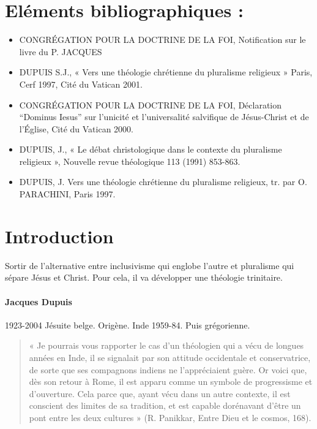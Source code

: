 

\section{Eléments bibliographiques :}
\begin{itemize}
    \item CONGRÉGATION POUR LA DOCTRINE DE LA FOI, Notification sur le livre du P. JACQUES
   \item DUPUIS S.J., « Vers une théologie chrétienne du pluralisme religieux » Paris, Cerf 1997,
Cité du Vatican 2001.
   \item CONGRÉGATION POUR LA DOCTRINE DE LA FOI, Déclaration “Dominus Iesus” sur l’unicité
et l’universalité salvifique de Jésus-Christ et de l’Église, Cité du Vatican 2000.
   \item DUPUIS, J., « Le débat christologique dans le contexte du pluralisme religieux », Nouvelle
revue théologique 113 (1991) 853-863.
   \item DUPUIS, J. Vers une théologie chrétienne du pluralisme religieux, tr. par O. PARACHINI, Paris
1997.
\end{itemize}


\section{Introduction}

\begin{Prop}
Sortir de l'alternative entre inclusivisme qui englobe l'autre et pluralisme qui sépare Jésus et Christ.
Pour cela, il va développer une théologie trinitaire. 
\end{Prop}



\paragraph{Jacques Dupuis} 1923-2004 Jésuite belge. Origène. Inde 1959-84. Puis grégorienne.

\begin{quote}
    « Je pourrais vous rapporter le cas d’un théologien qui a vécu de longues années en Inde, il se signalait
par son attitude occidentale et conservatrice, de sorte que ses compagnons indiens ne l’appréciaient
guère. Or voici que, dès son retour à Rome, il est apparu comme un symbole de progressisme et
d’ouverture. Cela parce que, ayant vécu dans un autre contexte, il est conscient des limites de sa
tradition, et est capable dorénavant d’être un pont entre les deux cultures » (R. Panikkar, Entre Dieu et
le cosmos, 168).
\end{quote}

